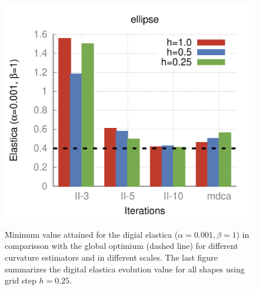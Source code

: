 \begin{figure}[]
{\includegraphics[scale=0.4]{figures/chapter5/flow/plots/bars/length_pen_0.00100/ellipse.pdf}
}\hspace{1em}%
%
\caption{Minimum value attained for the digial elastica ($\alpha=0.001, \beta=1$) in comparisson with the global optimium (dashed line) for different curvature estimators and in different scales. The last figure summarizes the digital elastica evolution value for all shapes using grid step $h=0.25$.}
\label{fig:local-comb-estimators-plots-lp0001}
\end{figure}


